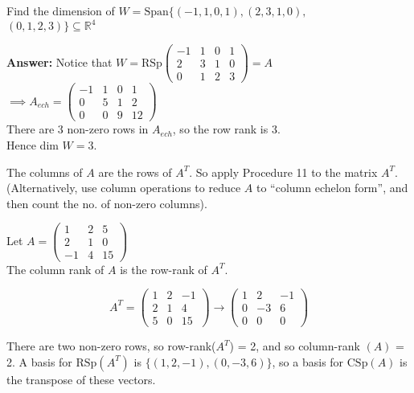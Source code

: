 \begin{example} Find the dimension of $W = \text{Span}\{(-1,1,0,1),(2,3,1,0),$\\$(0,1,2,3)\} \subseteq \mathbb{R}^4$

 \textbf{Answer:} Notice that $W = \text{RSp} \begin{pmatrix}
 -1 & 1 & 0 & 1\\ 2 & 3 & 1 & 0\\ 0 & 1 & 2 & 3
 \end{pmatrix} = A$\\
 
 $\implies A_{ech} =  
 \begin{pmatrix}
 -1 & 1 & 0 & 1 \\ 0 & 5 & 1 & 2 \\ 0 & 0 & 9 & 12
 \end{pmatrix}
 $\\
 
There are 3 non-zero rows in $A_{ech}$, so the row rank is 3.\\ Hence dim $W = 3$.
\end{example}\vspace*{10pt}

\begin{proc}The columns of $A$ are the rows of $A^T$. So apply Procedure 11 to the matrix $A^T$. (Alternatively, use column operations to reduce $A$ to ``column echelon form'', and then count the no. of non-zero columns).\end{proc}

\begin{example} Let $A = \begin{pmatrix}
 1 & 2 & 5\\ 2 & 1 & 0\\ -1 &4 & 15
 \end{pmatrix}
 $\\
 
 The column rank of $A$ is the row-rank of $A^T$.
 
 \[A^T = \begin{pmatrix}
 1 & 2 & -1\\ 2 & 1 & 4\\ 5 & 0 & 15
 \end{pmatrix}
 \to 
 \begin{pmatrix}
 1 & 2 & -1\\ 0 & -3 & 6\\ 0 & 0 & 0
 \end{pmatrix}\]
 
 There are two non-zero rows, so row-rank($A^T$) = 2, and so column-rank $(A)$ = 2. A basis for $\text{RSp}(A^T)$ is $\{(1,2,-1),(0,-3,6)\}$, so a basis for $\text{CSp}(A)$ is the transpose of these vectors.
 \end{example}
 
